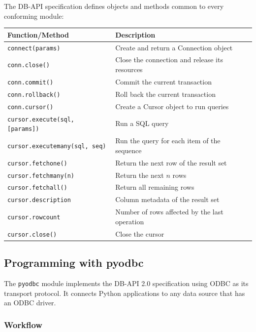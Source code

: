 The DB-API specification defines objects and methods common to every conforming module:

{
\scriptsize
\begin{center}
\begin{tabular}{@{}ll@{}}
\toprule
\textbf{Function/Method} & \textbf{Description} \\
\midrule
\texttt{connect(params)} & Create and return a Connection object \\
\texttt{conn.close()} & Close the connection and release its resources \\
\texttt{conn.commit()} & Commit the current transaction \\
\texttt{conn.rollback()} & Roll back the current transaction \\
\texttt{conn.cursor()} & Create a Cursor object to run queries \\
\texttt{cursor.execute(sql, [params])} & Run a SQL query \\
\texttt{cursor.executemany(sql, seq)} & Run the query for each item of the sequence \\
\texttt{cursor.fetchone()} & Return the next row of the result set \\
\texttt{cursor.fetchmany(n)} & Return the next $n$ rows \\
\texttt{cursor.fetchall()} & Return all remaining rows \\
\texttt{cursor.description} & Column metadata of the result set \\
\texttt{cursor.rowcount} & Number of rows affected by the last operation \\
\texttt{cursor.close()} & Close the cursor \\
\bottomrule
\end{tabular}
\end{center}
}

\subsection{Programming with pyodbc}
\label{sec:pyodbc-programming}

The \texttt{pyodbc} module implements the DB-API 2.0 specification using ODBC as its transport protocol. It connects Python applications to any data source that has an ODBC driver.

\subsubsection{Workflow}
\label{subsec:pyodbc-workflow}

